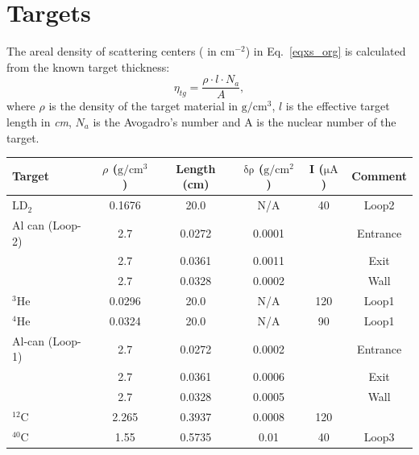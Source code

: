 \section{Targets}
 The areal density of scattering centers ( in $\mathrm{cm^{-2}}$) in Eq.~\eqref{eqxs_org} is calculated from the known target thickness:
\begin{equation}
  \eta_{tg} = \frac{\rho\cdot l \cdot N_{a}}{A},
  \label{eq_ntg}
\end{equation}
where $\rho$ is the density of the target material in $\mathrm{g/cm^{3}}$, $l$ is the effective target length in \emph{cm}, $N_{a}$ is the Avogadro's number and A is the nuclear number of the target.
\begin{table}[htbp]
   \begin{tabular}{lccccc}
   \toprule
   Target       &$\rho$ ($\mathrm{g/cm^{3}}$)& Length (cm)   & $\mathrm{\delta\rho}$ ($\mathrm{g/cm^{2}}$)& I ($\mathrm{\mu A}$)& Comment   \\
   \midrule
   $\mathrm{LD_{2}}$& 0.1676                 & 20.0          &     N/A                & 40          &Loop2      \\
   Al can (Loop-2)  & 2.7                    & 0.0272        &     0.0001             &             &  Entrance\\
                    & 2.7                    & 0.0361        &     0.0011             &             &  Exit     \\
                    & 2.7                    & 0.0328        &     0.0002             &             &  Wall     \\
   $\mathrm{^{3}He}$& 0.0296                 & 20.0          &     N/A                &120         &  Loop1    \\
   $\mathrm{^{4}He}$& 0.0324                 & 20.0          &     N/A                &90           &  Loop1    \\
   Al-can (Loop-1)  & 2.7                    & 0.0272        &     0.0002             &             &  Entrance \\
                    & 2.7                    & 0.0361        &     0.0006             &             &  Exit     \\
                    & 2.7                    & 0.0328        &     0.0005             &             &  Wall     \\
   $\mathrm{^{12}C}$&      2.265             & 0.3937        &     0.0008             &120          &           \\
   $\mathrm{^{40}C}$&      1.55              & 0.5735        &     0.01               &40           &  Loop3    \\

\end{tabular}
\end{table}
